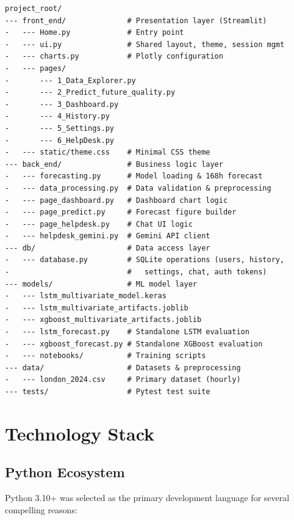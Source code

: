 \begin{verbatim}
project_root/
--- front_end/              # Presentation layer (Streamlit)
-   --- Home.py             # Entry point
-   --- ui.py               # Shared layout, theme, session mgmt
-   --- charts.py           # Plotly configuration
-   --- pages/
-       --- 1_Data_Explorer.py
-       --- 2_Predict_future_quality.py
-       --- 3_Dashboard.py
-       --- 4_History.py
-       --- 5_Settings.py
-       --- 6_HelpDesk.py
-   --- static/theme.css    # Minimal CSS theme
--- back_end/               # Business logic layer
-   --- forecasting.py      # Model loading & 168h forecast
-   --- data_processing.py  # Data validation & preprocessing
-   --- page_dashboard.py   # Dashboard chart logic
-   --- page_predict.py     # Forecast figure builder
-   --- page_helpdesk.py    # Chat UI logic
-   --- helpdesk_gemini.py  # Gemini API client
--- db/                     # Data access layer
-   --- database.py         # SQLite operations (users, history,
-                           #   settings, chat, auth tokens)
--- models/                 # ML model layer
-   --- lstm_multivariate_model.keras
-   --- lstm_multivariate_artifacts.joblib
-   --- xgboost_multivariate_artifacts.joblib
-   --- lstm_forecast.py    # Standalone LSTM evaluation
-   --- xgboost_forecast.py # Standalone XGBoost evaluation
-   --- notebooks/          # Training scripts
--- data/                   # Datasets & preprocessing
-   --- london_2024.csv     # Primary dataset (hourly)
--- tests/                  # Pytest test suite
\end{verbatim}

\section{Technology Stack}
\label{sec:techstack}

\subsection{Python Ecosystem}

Python 3.10+ was selected as the primary development language for several compelling reasons:

